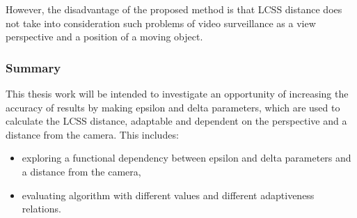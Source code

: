 However, the disadvantage of the proposed method is that LCSS distance does not take into consideration such problems of video surveillance as a view perspective and a position of a moving object. 

\subsubsection{Summary}

This thesis work will be intended to investigate an opportunity of increasing the accuracy of results by making epsilon and delta parameters, which are used to calculate the LCSS distance, adaptable and dependent on the perspective and a distance from the camera. This includes:

\begin{itemize}
	\setlength\itemsep{0em}
	\item exploring a functional dependency between epsilon and delta parameters and a distance from the camera,
	\item evaluating algorithm with different values and different adaptiveness relations.
\end{itemize}